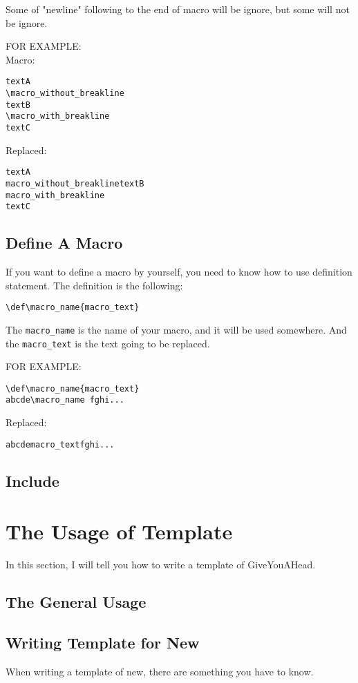 \documentclass[UTF8]{article} %
\begin{document}
Some of "newline" following to the end of macro will be ignore, but some will not be ignore.

FOR EXAMPLE:\\
Macro:
\begin{lstlisting}
textA
\macro_without_breakline
textB
\macro_with_breakline
textC
\end{lstlisting}
Replaced:
\begin{lstlisting}
textA
macro_without_breaklinetextB
macro_with_breakline
textC
\end{lstlisting}

\subsection{Define A Macro}
If you want to define a macro by yourself, you need to know how to use definition statement.
The definition is the following:
\begin{lstlisting}
\def\macro_name{macro_text}
\end{lstlisting}

The \verb"macro_name" is the name of your macro, and it will be used somewhere. And the \verb"macro_text" is the text going to be replaced.

FOR EXAMPLE:
\begin{lstlisting}
\def\macro_name{macro_text}
abcde\macro_name fghi...
\end{lstlisting}
Replaced:
\begin{lstlisting}
abcdemacro_textfghi...
\end{lstlisting}
\subsection{Include}


\newpage
 
\section{The Usage of Template}
In this section, I will tell you how to write a template of GiveYouAHead.
\subsection{The General Usage}
\subsection{Writing Template for New}
When writing a template of new, there are something you have to know.
\end{document}
